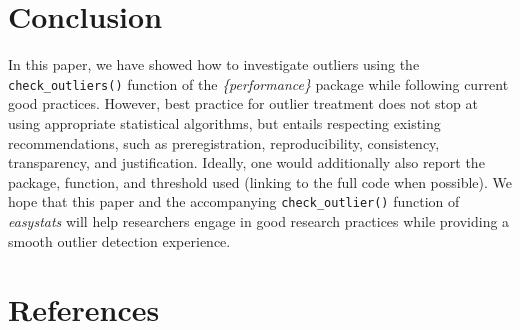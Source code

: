 \documentclass{article}
\begin{document}
\hypertarget{conclusion}{%
\section{Conclusion}\label{conclusion}}

In this paper, we have showed how to investigate outliers using the
\texttt{check\_outliers()} function of the \emph{\{performance\}}
package while following current good practices. However, best practice
for outlier treatment does not stop at using appropriate statistical
algorithms, but entails respecting existing recommendations, such as
preregistration, reproducibility, consistency, transparency, and
justification. Ideally, one would additionally also report the package,
function, and threshold used (linking to the full code when possible).
We hope that this paper and the accompanying \texttt{check\_outlier()}
function of \emph{easystats} will help researchers engage in good
research practices while providing a smooth outlier detection
experience.

\hypertarget{references}{%
\section*{References}\label{references}}
\end{document}

